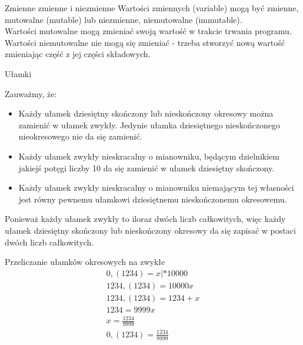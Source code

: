 \begin{frame}{Zmienne zmienne i niezmienne}
    Wartości zmiennych (variable) mogą być zmienne, mutowalne (mutable) lub niezmienne, niemutowalne (immutable). \\
    Wartości mutowalne mogą zmieniać swoją wartość w trakcie trwania programu. \\
    Wartości niemutowalne nie mogą się zmieniać - trzeba stworzyć nową wartość zmieniając część z jej części składowych. \\
    
\end{frame}

\begin{frame}{Ułamki}
    \begin{justify}
        Zauważmy, że:
        \begin{itemize}
            \item Każdy ułamek dziesiętny skończony lub nieskończony okresowy można zamienić w ułamek zwykły.
            Jedynie ułamka dziesiętnego nieskończonego nieokresowego nie da się zamienić. \\
            \item Każdy ułamek zwykły nieskracalny o mianowniku, będącym dzielnikiem
            jakiejś potęgi liczby 10 da się zamienić w ułamek dziesiętny skończony. \\
            \item Każdy ułamek zwykły nieskracalny o mianowniku niemającym tej własności
            jest równy pewnemu ułamkowi dziesiętnemu nieskończonemu okresowemu. \\
        \end{itemize}

        Ponieważ każdy ułamek zwykły to iloraz dwóch liczb całkowitych, więc każdy ułamek dziesiętny
        skończony lub nieskończony okresowy da się zapisać w postaci dwóch liczb całkowitych.
    \end{justify}
\end{frame}
\begin{frame}{Przeliczanie ułamków okresowych na zwykłe}
    \begin{gather*}
        0,(1234) = x | * 10000 \\
        1234,(1234) = 10000x \\
        1234,(1234) = 1234 + x \\
        1234 = 9999x \\
        x = \frac{1234}{9999} \\
        0,(1234) = \frac{1234}{9999} \\
    \end{gather*}
\end{frame}

